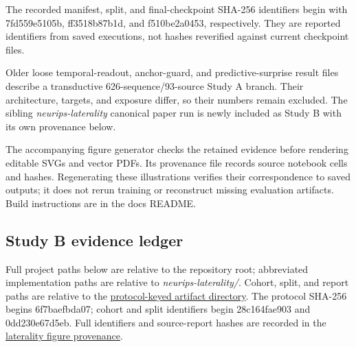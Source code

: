 \documentclass[11pt,letterpaper]{article}
\begin{document}
The recorded manifest, split, and final-checkpoint SHA-256 identifiers
begin with 7fd559e5105b, ff3518b87b1d, and f510be2a0453, respectively.
They are reported identifiers from saved executions, not hashes
reverified against current checkpoint files.

Older loose temporal-readout, anchor-guard, and predictive-surprise
result files describe a transductive 626-sequence/93-source Study A
branch. Their architecture, targets, and exposure differ, so their
numbers remain excluded. The sibling \emph{neurips-laterality} canonical
paper run is newly included as Study B with its own provenance below.

The accompanying figure generator checks the retained evidence before
rendering editable SVGs and vector PDFs. Its provenance file records
source notebook cells and hashes. Regenerating these illustrations
verifies their correspondence to saved outputs; it does not rerun
training or reconstruct missing evaluation artifacts. Build instructions
are in the docs README.

\subsection{Study B evidence ledger}\label{study-b-evidence-ledger}

Full project paths below are relative to the repository root;
abbreviated implementation paths are relative to
\emph{neurips-laterality/}. Cohort, split, and report paths are relative
to the
\href{../../neurips-laterality/artifacts/paper/protocol_6f7baefbda07/}{protocol-keyed
artifact directory}. The protocol SHA-256 begins 6f7baefbda07; cohort
and split identifiers begin 28c164fae903 and 0dd230e67d5eb. Full
identifiers and source-report hashes are recorded in the
\href{figures/submission_laterality_provenance.json}{laterality figure
provenance}.
\end{document}

